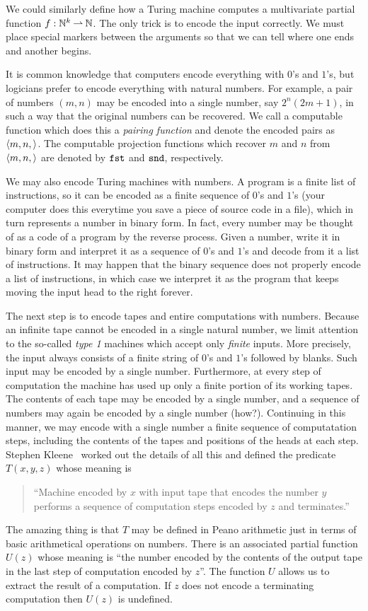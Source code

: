 We could similarly define how a Turing machine computes a multivariate
partial function $f : \mathbb{N}^k \mathbin{\rightharpoonup} \mathbb{N}$. The only trick is to encode
the input correctly. We must place special markers between the
arguments so that we can tell where one ends and another begins.

It is common knowledge that computers encode everything with $0$'s and
$1$'s, but logicians prefer to encode everything with natural numbers.
For example, a pair of numbers $(m, n)$ may be encoded into a single
number, say $2^n (2 m + 1)$, in such a way that the original numbers
can be recovered. We call a computable function which does this a
\emph{pairing function} and denote the encoded pairs as $\langle m,n, \rangle$.
The computable projection functions which recover $m$ and $n$ from
$\langle m, n, \rangle$ are denoted by $\mathtt{fst}$ and $\mathtt{snd}$, respectively.

We may also encode Turing machines with numbers. A program is a finite
list of instructions, so it can be encoded as a finite sequence of
$0$'s and $1$'s (your computer does this everytime you save a piece of
source code in a file), which in turn represents a number in binary
form. In fact, every number may be thought of as a code of a program
by the reverse process. Given a number, write it in binary form and
interpret it as a sequence of $0$'s and $1$'s and decode from it a
list of instructions. It may happen that the binary sequence does not
properly encode a list of instructions, in which case we interpret it
as the program that keeps moving the input head to the right forever.

The next step is to encode tapes and entire computations with numbers.
Because an infinite tape cannot be encoded in a single natural number,
we limit attention to the so-called \emph{type 1} machines which
accept only \emph{finite} inputs. More precisely, the input always
consists of a finite string of $0$'s and $1$'s followed by blanks.
Such input may be encoded by a single number. Furthermore, at every
step of computation the machine has used up only a finite portion of
its working tapes. The contents of each tape may be encoded by a
single number, and a sequence of numbers may again be encoded by a
single number (how?). Continuing in this manner, we may encode with a
single number a finite sequence of computatation steps, including the
contents of the tapes and positions of the heads at each step. Stephen
Kleene~\cite{kleeneT} worked out the details of all this and defined
the predicate $T(x,y,z)$ whose meaning is
%
\begin{quote}
  ``Machine encoded by $x$ with input tape that encodes the number $y$
  performs a sequence of computation steps encoded by $z$ and
  terminates.''
\end{quote}
%
The amazing thing is that $T$ may be defined in Peano arithmetic just
in terms of basic arithmetical operations on numbers. There is an
associated partial function $U(z)$ whose meaning is ``the number
encoded by the contents of the output tape in the last step of
computation encoded by $z$''. The function $U$ allows us to extract
the result of a computation. If $z$ does not encode a terminating
computation then $U(z)$ is undefined.

